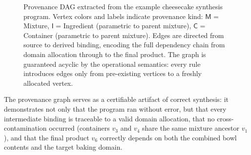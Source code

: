 \documentclass[11pt, a4paper]{article}
\begin{document}
\begin{figure}[htbp]
\centering
{}
\caption{Provenance DAG extracted from the example cheesecake synthesis program. Vertex colors and labels indicate provenance kind: $\mathsf{M}$ = Mixture, $\mathsf{I}$ = Ingredient (parametric to parent mixture), $\mathsf{C}$ = Container (parametric to parent mixture). Edges are directed from source to derived binding, encoding the full dependency chain from domain allocation through to the final product. The graph is guaranteed acyclic by the operational semantics: every rule introduces edges only from pre-existing vertices to a freshly allocated vertex.}
\label{fig:provenance-dag}
\end{figure}

The provenance graph serves as a certifiable artifact of correct synthesis: it demonstrates not only that the program ran without error, but that every intermediate binding is traceable to a valid domain allocation, that no cross-contamination occurred (containers $v_3$ and $v_4$ share the same mixture ancestor $v_1$), and that the final product $v_6$ correctly depends on both the combined bowl contents and the target baking domain.
\end{document}
